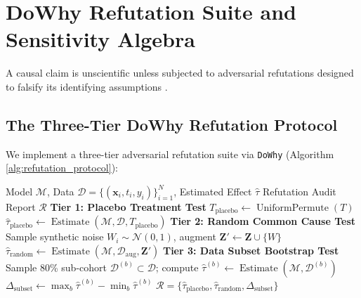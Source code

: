 \section{DoWhy Refutation Suite and Sensitivity Algebra}
\label{sec:meth_refutations}

A causal claim is unscientific unless subjected to adversarial refutations designed to falsify its identifying assumptions \parencite{sharma2020dowhy, cinelli2020making}.

\subsection{The Three-Tier DoWhy Refutation Protocol}

We implement a three-tier adversarial refutation suite via \texttt{DoWhy} (Algorithm \ref{alg:refutation_protocol}):

\begin{algorithm}[htbp]
\caption{Three-Tier Adversarial Causal Refutation Protocol}
\label{alg:refutation_protocol}
\begin{algorithmic}[1]
\Require Model $\mathcal{M}$, Data $\mathcal{D} = \{(\mathbf{x}_i, t_i, y_i)\}_{i=1}^N$, Estimated Effect $\hat{\tau}$
\Ensure Refutation Audit Report $\mathcal{R}$
\Statex \textbf{Tier 1: Placebo Treatment Test}
\State $T_{\text{placebo}} \leftarrow \operatorname{UniformPermute}(T)$
\State $\hat{\tau}_{\text{placebo}} \leftarrow \operatorname{Estimate}(\mathcal{M}, \mathcal{D}, T_{\text{placebo}})$ 
\Statex \textbf{Tier 2: Random Common Cause Test}
\State Sample synthetic noise $W_i \sim \mathcal{N}(0, 1)$, augment $\mathbf{Z}' \leftarrow \mathbf{Z} \cup \{W\}$
\State $\hat{\tau}_{\text{random}} \leftarrow \operatorname{Estimate}(\mathcal{M}, \mathcal{D}_{\text{aug}}, \mathbf{Z}')$ 
\Statex \textbf{Tier 3: Data Subset Bootstrap Test}
    \State Sample 80\% sub-cohort $\mathcal{D}^{(b)} \subset \mathcal{D}$; compute $\hat{\tau}^{(b)} \leftarrow \operatorname{Estimate}(\mathcal{M}, \mathcal{D}^{(b)})$
\EndFor
\State $\Delta_{\text{subset}} \leftarrow \max_b \hat{\tau}^{(b)} - \min_b \hat{\tau}^{(b)}$ 
\State \Return $\mathcal{R} = \{\hat{\tau}_{\text{placebo}}, \hat{\tau}_{\text{random}}, \Delta_{\text{subset}}\}$
\end{algorithmic}
\end{algorithm}

